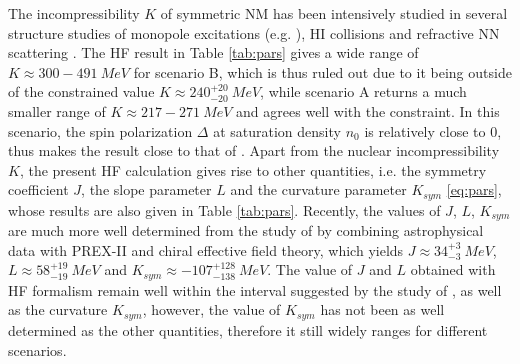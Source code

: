 The incompressibility $K$ of symmetric \gls{NM} has been intensively studied in several structure studies of monopole excitations (e.g. \cite{garg2018compression}), \gls{HI} collisions and refractive \gls{NN} scattering \citep{khoa2007nuclear}. The \gls{HF} result in Table \ref{tab:pars} gives a wide range of $K\approx 300-491\: MeV$ for scenario B, which is thus ruled out due to it being outside of the constrained value $K\approx 240^{+20}_{-20}\:MeV$, while scenario A returns a much smaller range of $K\approx 217-271\:MeV$ and agrees well with the constraint. In this scenario, the spin polarization $\Delta$ at saturation density $n_0$ is relatively close to $0$, thus makes the result close to that of \cite{tan2020spin}. Apart from the nuclear incompressibility $K$, the present \gls{HF} calculation gives rise to other quantities, i.e. the symmetry coefficient $J$, the slope parameter $L$ and the curvature parameter $K_{sym}$ \eqref{eq:pars}, whose results are also given in Table \ref{tab:pars}. Recently, the values of $J$, $L$, $K_{sym}$ are much more well determined from the study of \cite{essick2021astrophysical} by combining astrophysical data with PREX-II and chiral effective field theory, which yields $J\approx 34^{+3}_{-3}\:MeV$, $L\approx 58^{+19}_{-19}\:MeV$ and $K_{sym}\approx -107^{+128}_{-138}\:MeV$. The value of $J$ and $L$ obtained with \gls{HF} formalism remain well within the interval suggested by the study of \cite{essick2021astrophysical}, as well as the curvature $K_{sym}$, however, the value of $K_{sym}$ has not been as well determined as the other quantities, therefore it still widely ranges for different scenarios.\par
